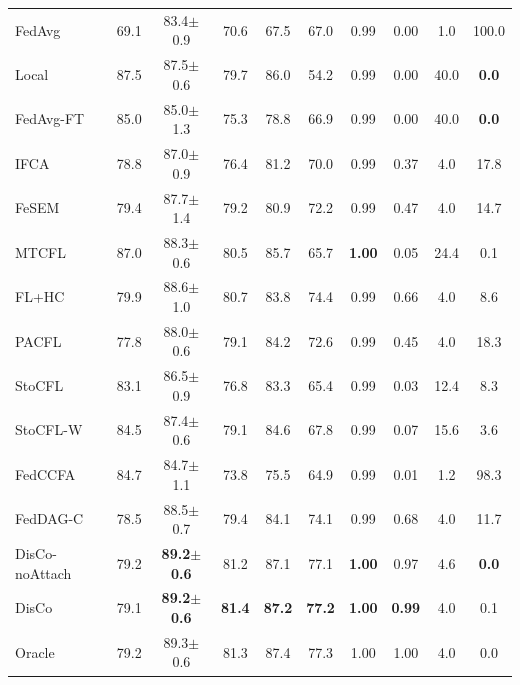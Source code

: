\begin{tabular}{lccccccccc}
FedAvg & 69.1 & 83.4$\pm$0.9 & 70.6 & 67.5 & 67.0 & 0.99 & 0.00 & 1.0 & 100.0 \\
Local & 87.5 & 87.5$\pm$0.6 & 79.7 & 86.0 & 54.2 & 0.99 & 0.00 & 40.0 & \textbf{0.0} \\
FedAvg-FT & 85.0 & 85.0$\pm$1.3 & 75.3 & 78.8 & 66.9 & 0.99 & 0.00 & 40.0 & \textbf{0.0} \\
IFCA & 78.8 & 87.0$\pm$0.9 & 76.4 & 81.2 & 70.0 & 0.99 & 0.37 & 4.0 & 17.8 \\
FeSEM & 79.4 & 87.7$\pm$1.4 & 79.2 & 80.9 & 72.2 & 0.99 & 0.47 & 4.0 & 14.7 \\
MTCFL & 87.0 & 88.3$\pm$0.6 & 80.5 & 85.7 & 65.7 & \textbf{1.00} & 0.05 & 24.4 & 0.1 \\
FL+HC & 79.9 & 88.6$\pm$1.0 & 80.7 & 83.8 & 74.4 & 0.99 & 0.66 & 4.0 & 8.6 \\
PACFL & 77.8 & 88.0$\pm$0.6 & 79.1 & 84.2 & 72.6 & 0.99 & 0.45 & 4.0 & 18.3 \\
StoCFL & 83.1 & 86.5$\pm$0.9 & 76.8 & 83.3 & 65.4 & 0.99 & 0.03 & 12.4 & 8.3 \\
StoCFL-W & 84.5 & 87.4$\pm$0.6 & 79.1 & 84.6 & 67.8 & 0.99 & 0.07 & 15.6 & 3.6 \\
FedCCFA & 84.7 & 84.7$\pm$1.1 & 73.8 & 75.5 & 64.9 & 0.99 & 0.01 & 1.2 & 98.3 \\
FedDAG-C & 78.5 & 88.5$\pm$0.7 & 79.4 & 84.1 & 74.1 & 0.99 & 0.68 & 4.0 & 11.7 \\
DisCo-noAttach & 79.2 & \textbf{89.2$\pm$0.6} & 81.2 & 87.1 & 77.1 & \textbf{1.00} & 0.97 & 4.6 & \textbf{0.0} \\
DisCo & 79.1 & \textbf{89.2$\pm$0.6} & \textbf{81.4} & \textbf{87.2} & \textbf{77.2} & \textbf{1.00} & \textbf{0.99} & 4.0 & 0.1 \\
Oracle & 79.2 & 89.3$\pm$0.6 & 81.3 & 87.4 & 77.3 & 1.00 & 1.00 & 4.0 & 0.0 \\
\bottomrule
\end{tabular}
